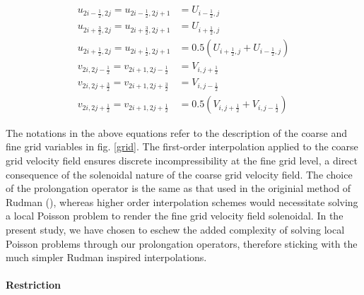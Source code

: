 \begin{equation}
  \begin{aligned}
  	  u_{2i-\frac{1}{2},2j} = u_{2i-\frac{1}{2},2j+1} &= U_{i-\frac{1}{2},j} \\ 
            u_{2i+\frac{3}{2},2j} = u_{2i+\frac{3}{2},2j+1} &= U_{i+\frac{1}{2},j} \\ 
  	  u_{2i+\frac{1}{2},2j} = u_{2i+\frac{1}{2},2j+1} &= 0.5\left(U_{i+\frac{1}{2},j} + U_{i-\frac{1}{2},j}\right) \\
  	  v_{2i,2j-\frac{1}{2}} = v_{2i+1,2j-\frac{1}{2}} &= V_{i,j+\frac{1}{2}} \\ 
            v_{2i,2j+\frac{3}{2}} = v_{2i+1,2j+\frac{3}{2}} &= V_{i,j-\frac{1}{2}} \\
  	  v_{2i,2j+\frac{1}{2}} = v_{2i+1,2j+\frac{1}{2}} &= 0.5\left(V_{i,j+\frac{1}{2}} + V_{i,j-\frac{1}{2}}\right) 
  \end{aligned}
\end{equation}


The notations in the above equations refer to the description of the coarse and fine grid variables in fig. \ref{grid}. The first-order interpolation applied to the coarse grid velocity field ensures discrete incompressibility at the fine grid level, a direct consequence of the solenoidal nature of the coarse grid velocity field. The choice of the prolongation operator is the same as that used in the originial method of Rudman (\cite{rudman1998volume}), whereas higher order interpolation schemes would necessitate solving a local Poisson problem to render the fine grid velocity field solenoidal. In the present study, we have chosen to eschew the added complexity of solving local Poisson problems through our prolongation operators, therefore sticking with the much simpler Rudman inspired interpolations. 


\paragraph{\textbf{Restriction}}

